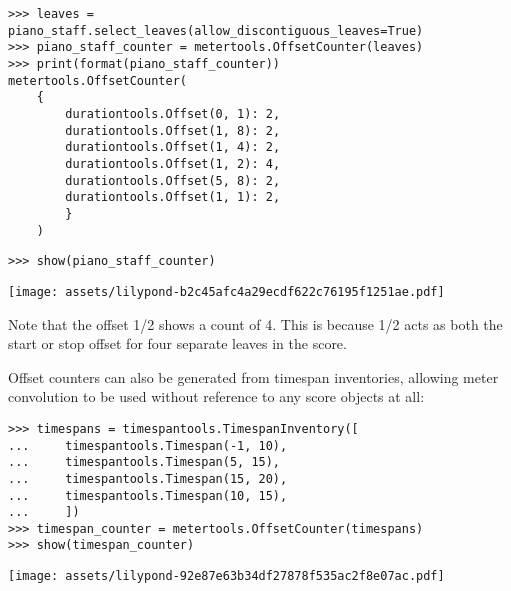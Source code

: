 \begin{singlespacing}
\vspace{-0.5\baselineskip}
\begin{lstlisting}
>>> leaves = piano_staff.select_leaves(allow_discontiguous_leaves=True)
>>> piano_staff_counter = metertools.OffsetCounter(leaves)
>>> print(format(piano_staff_counter))
metertools.OffsetCounter(
    {
        durationtools.Offset(0, 1): 2,
        durationtools.Offset(1, 8): 2,
        durationtools.Offset(1, 4): 2,
        durationtools.Offset(1, 2): 4,
        durationtools.Offset(5, 8): 2,
        durationtools.Offset(1, 1): 2,
        }
    )
\end{lstlisting}
\begin{lstlisting}
>>> show(piano_staff_counter)
\end{lstlisting}
\noindent\texttt{[image: assets/lilypond-b2c45afc4a29ecdf622c76195f1251ae.pdf]}
\end{singlespacing}

\noindent Note that the offset 1/2 shows a count of 4. This is because 1/2 acts
as both the start or stop offset for four separate leaves in the score.

Offset counters can also be generated from timespan inventories, allowing meter
convolution to be used without reference to any score objects at all:

\begin{comment}
<abjad>
timespans = timespantools.TimespanInventory([
    timespantools.Timespan(-1, 10),
    timespantools.Timespan(5, 15),
    timespantools.Timespan(15, 20),
    timespantools.Timespan(10, 15),
    ])
timespan_counter = metertools.OffsetCounter(timespans)
show(timespan_counter)
</abjad>
\end{comment}

\begin{singlespacing}
\vspace{-0.5\baselineskip}
\begin{lstlisting}
>>> timespans = timespantools.TimespanInventory([
...     timespantools.Timespan(-1, 10),
...     timespantools.Timespan(5, 15),
...     timespantools.Timespan(15, 20),
...     timespantools.Timespan(10, 15),
...     ])
>>> timespan_counter = metertools.OffsetCounter(timespans)
>>> show(timespan_counter)
\end{lstlisting}
\noindent\texttt{[image: assets/lilypond-92e87e63b34df27878f535ac2f8e07ac.pdf]}
\end{singlespacing}

